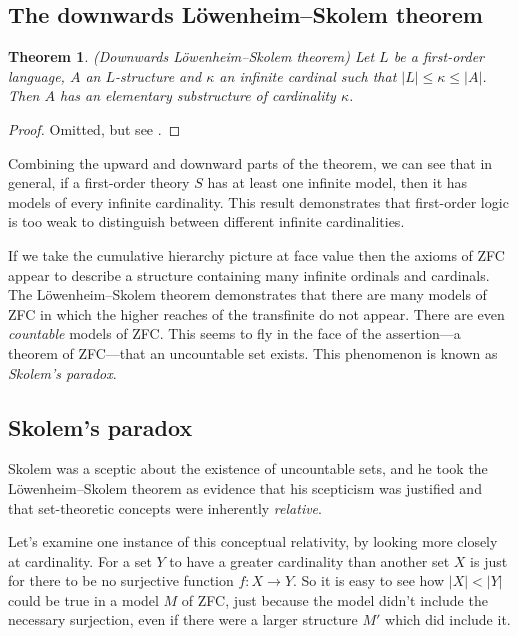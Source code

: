 \documentclass[10pt, a4paper, oneside]{article}
\newtheorem{thm}{Theorem}[section]
\theoremstyle{definition}
\theoremstyle{remark}
\theoremstyle{plain}
\theoremstyle{plain}
\begin{document}
\subsection{The downwards Löwenheim--Skolem theorem}

\begin{thm}
    \label{down_lst}
    (Downwards Löwenheim--Skolem theorem)
    Let $L$ be a first-order language, $A$ an $L$-structure and $\kappa$ an
    infinite cardinal such that $|L| \leq \kappa \leq |A|$. Then $A$ has an
    elementary substructure of cardinality $\kappa$.
\end{thm}

\begin{proof}
    Omitted, but see \citealt[pp. 69--72]{hodges1997}.
\end{proof}

Combining the upward and downward parts of the theorem, we can see that in
general, if a first-order theory $S$ has at least one infinite model, then it
has models of every infinite cardinality. This result demonstrates that
first-order logic is too weak to distinguish between different infinite
cardinalities.

If we take the cumulative hierarchy picture at face value then the axioms of ZFC
appear to describe a structure containing many infinite ordinals and cardinals.
The Löwenheim--Skolem theorem demonstrates that there are many models of ZFC in
which the higher reaches of the transfinite do not appear. There are even
\emph{countable} models of ZFC. This seems to fly in the face of the
assertion---a theorem of ZFC---that an uncountable set exists. This phenomenon
is known as \emph{Skolem's paradox}.

\subsection{Skolem's paradox}

Skolem was a sceptic about the existence of uncountable sets, and he took the
Löwenheim--Skolem theorem as evidence that his scepticism was justified and
that set-theoretic concepts were inherently \emph{relative}.

Let's examine one instance of this conceptual relativity, by looking more
closely at cardinality. For a set $Y$ to have a greater cardinality than another
set $X$ is just for there to be no surjective function $f : X \rightarrow Y$. So
it is easy to see how $|X| < |Y|$ could be true in a model $M$ of ZFC, just
because the model didn't include the necessary surjection, even if there were a
larger structure $M'$ which did include it.
\end{document}
